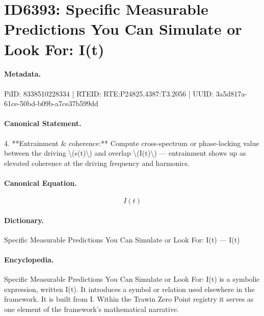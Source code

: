 \section*{ID6393: Specific Measurable Predictions You Can Simulate or Look For: I(t)}
\paragraph{Metadata.}
PiID: 8338510228334 | RTEID: RTE:P24825.4387:T3.2056 | UUID: 3a5d817a-61ce-50bd-b09b-a7ce37b599dd

\paragraph{Canonical Statement.}
4. **Entrainment \& coherence:** Compute cross-spectrum or phase-locking value between the driving \textbackslash{}(s(t)\textbackslash{}) and overlap \textbackslash{}(I(t)\textbackslash{}) — entrainment shows up as elevated coherence at the driving frequency and harmonics.

\paragraph{Canonical Equation.}
\[
I(t)
\]

\paragraph{Dictionary.}
Specific Measurable Predictions You Can Simulate or Look For: I(t) — I(t)

\paragraph{Encyclopedia.}
Specific Measurable Predictions You Can Simulate or Look For: I(t) is a symbolic expression, written I(t). It introduces a symbol or relation used elsewhere in the framework. It is built from I. Within the Trawin Zero Point registry it serves as one element of the framework's mathematical narrative.
